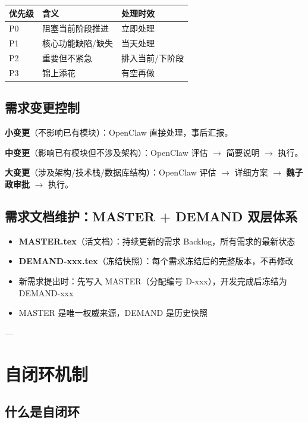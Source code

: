 \documentclass[11pt,a4paper]{article}
\begin{document}
\begin{table}[h]
\centering
\begin{tabularx}{\linewidth}{llX}
\toprule
\textbf{优先级} & \textbf{含义} & \textbf{处理时效} \\
\midrule
P0 & 阻塞当前阶段推进 & 立即处理 \\
P1 & 核心功能缺陷/缺失 & 当天处理 \\
P2 & 重要但不紧急 & 排入当前/下阶段 \\
P3 & 锦上添花 & 有空再做 \\
\bottomrule
\end{tabularx}
\end{table}

\subsection{需求变更控制}

\textbf{小变更}（不影响已有模块）：OpenClaw 直接处理，事后汇报。

\textbf{中变更}（影响已有模块但不涉及架构）：OpenClaw 评估 $\to$ 简要说明 $\to$ 执行。

\textbf{大变更}（涉及架构/技术栈/数据库结构）：OpenClaw 评估 $\to$ 详细方案 $\to$ \textbf{魏子政审批} $\to$ 执行。

\subsection{需求文档维护：MASTER + DEMAND 双层体系}

\begin{itemize}[nosep]
  \item \textbf{MASTER.tex}（活文档）：持续更新的需求 Backlog，所有需求的最新状态
  \item \textbf{DEMAND-xxx.tex}（冻结快照）：每个需求冻结后的完整版本，不再修改
  \item 新需求提出时：先写入 MASTER（分配编号 D-xxx），开发完成后冻结为 DEMAND-xxx
  \item MASTER 是唯一权威来源，DEMAND 是历史快照
\end{itemize}

---

\section{自闭环机制}

\subsection{什么是自闭环}
\end{document}
